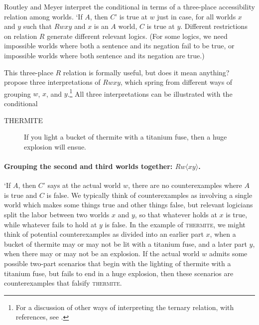 Routley and Meyer interpret the conditional in terms of a three-place accessibility relation among worlds.  `If $A$, then $C$' is true at $w$ just in case, for all worlds $x$ and $y$ such that $Rwxy$ and $x$ is an $A$ world, $C$ is true at $y$.  Different restrictions on relation $R$ generate different relevant logics.  (For some logics, we need impossible worlds where both a sentence and its negation fail to be true, or impossible worlds where both sentence and its negation are true.)

This three-place $R$ relation is formally useful, but does it mean anything?  \citet{Beall2012-BEAOTT-3} propose three interpretations of $Rwxy$, which spring from different ways of grouping $w$, $x$, and $y$.\footnote{For a discussion of other ways of interpreting the ternary relation, with references, see \citet{Jago2013-JAGRWI}.}  All three interpretations can be illustrated with the conditional
\begin{description}
\item[THERMITE] If you light a bucket of thermite with a titanium fuse, then a huge explosion will ensue.
\end{description}

\paragraph{Grouping the second and third worlds together: $Rw \langle xy \rangle$.} `If $A$, then $C$' says at the actual world $w$, there are no counterexamples where $A$ is true and $C$ is false.  We typically think of counterexamples as involving a single world which makes some things true and other things false, but relevant logicians split the labor between two worlds $x$ and $y$, so that whatever holds at $x$ is true, while whatever fails to hold at $y$ is false. In the example of \textsc{thermite}, we might think of potential counterexamples as divided into an earlier part $x$, when a bucket of thermite may or may not be lit with a titanium fuse, and a later part $y$, when there may or may not be an explosion.  If the actual world $w$ admits some possible two-part scenarios that begin with the lighting of thermite with a titanium fuse, but fails to end in a huge explosion, then these scenarios are counterexamples that falsify \textsc{thermite}.

